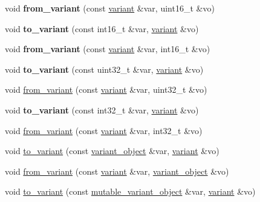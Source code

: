 \begin{DoxyCompactItemize}
\item 
\mbox{\label{namespacefc_af83fbb98c8255104a0ed6de3b9c15ef5}} 
void {\bfseries from\+\_\+variant} (const \mbox{\hyperlink{classfc_1_1variant}{variant}} \&var, uint16\+\_\+t \&vo)
\item 
\mbox{\label{namespacefc_a25f1e1eac8d6eea3f00c4d9b8365e2ff}} 
void {\bfseries to\+\_\+variant} (const int16\+\_\+t \&var, \mbox{\hyperlink{classfc_1_1variant}{variant}} \&vo)
\item 
\mbox{\label{namespacefc_a4d3dc6277e48ed34325016a114aee1f4}} 
void {\bfseries from\+\_\+variant} (const \mbox{\hyperlink{classfc_1_1variant}{variant}} \&var, int16\+\_\+t \&vo)
\item 
\mbox{\label{namespacefc_a0e629e1dd1a27c73a485f079a102e269}} 
void {\bfseries to\+\_\+variant} (const uint32\+\_\+t \&var, \mbox{\hyperlink{classfc_1_1variant}{variant}} \&vo)
\item 
void \mbox{\hyperlink{namespacefc_a46109f579b38c337e6492bc8b4e21f87}{from\+\_\+variant}} (const \mbox{\hyperlink{classfc_1_1variant}{variant}} \&var, uint32\+\_\+t \&vo)
\item 
\mbox{\label{namespacefc_acc843498f2744f0c9335d40f333d9b97}} 
void {\bfseries to\+\_\+variant} (const int32\+\_\+t \&var, \mbox{\hyperlink{classfc_1_1variant}{variant}} \&vo)
\item 
void \mbox{\hyperlink{namespacefc_acb9b6c248895ffbe62854128f4fde972}{from\+\_\+variant}} (const \mbox{\hyperlink{classfc_1_1variant}{variant}} \&var, int32\+\_\+t \&vo)
\item 
void \mbox{\hyperlink{namespacefc_a9c3517403d70a91f419b410ce27c85e8}{to\+\_\+variant}} (const \mbox{\hyperlink{classfc_1_1variant__object}{variant\+\_\+object}} \&var, \mbox{\hyperlink{classfc_1_1variant}{variant}} \&vo)
\item 
void \mbox{\hyperlink{namespacefc_a104f8e7cdb5c4d3ad26743ad03faf4da}{from\+\_\+variant}} (const \mbox{\hyperlink{classfc_1_1variant}{variant}} \&var, \mbox{\hyperlink{classfc_1_1variant__object}{variant\+\_\+object}} \&vo)
\item 
void \mbox{\hyperlink{namespacefc_a5dda2b00432404348bd4b1f2871ed515}{to\+\_\+variant}} (const \mbox{\hyperlink{classfc_1_1mutable__variant__object}{mutable\+\_\+variant\+\_\+object}} \&var, \mbox{\hyperlink{classfc_1_1variant}{variant}} \&vo)

\end{DoxyCompactItemize}
